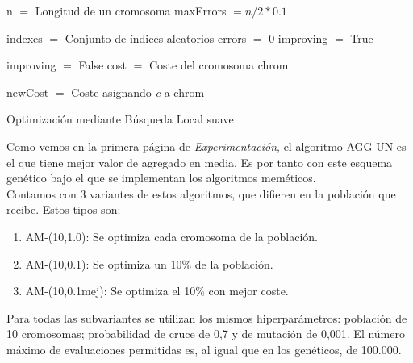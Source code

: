 \begin{algorithm}[H]
    \SetAlgoLined
        n $=$ Longitud de un cromosoma \;
        maxErrors $= n/2 * 0.1$ \;
         {
            indexes $=$ Conjunto de índices aleatorios \;
            errors $=$ 0 \;
            improving $=$ True \;

             {

                improving $=$ False \;
                cost $=$ Coste del cromosoma chrom \;

                 {
                    newCost $=$ Coste asignando \textit{c} a chrom \;
                }

            }
        }
    \caption{Optimización mediante Búsqueda Local suave}
\end{algorithm}

\vspace{\baselineskip}

Como vemos en la primera página de \textit{Experimentación}, el algoritmo AGG-UN es el que tiene mejor valor de agregado en media. Es por tanto con este esquema genético bajo el que se implementan los algoritmos meméticos. \\
Contamos con 3 variantes de estos algoritmos, que difieren en la población que recibe. Estos tipos son:

\begin{enumerate}
    \item AM-(10,1.0): Se optimiza cada cromosoma de la población.
    \item AM-(10,0.1): Se optimiza un 10\% de la población.
    \item AM-(10,0.1mej): Se optimiza el 10\% con mejor coste.
\end{enumerate}

Para todas las subvariantes se utilizan los mismos hiperparámetros: población de 10 cromosomas; probabilidad de cruce de 0,7 y de mutación de 0,001. El número máximo de evaluaciones permitidas es, al igual que en los genéticos, de 100.000.